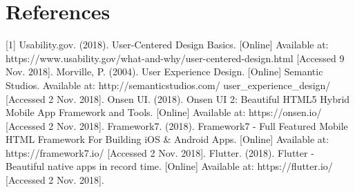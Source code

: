 \documentclass[a4paper, 11pt]{article} %
\begin{document}

\section{References}
    [1] Usability.gov. (2018). User-Centered Design Basics. [Online] Available at: https://www.usability.gov/what-and-why/user-centered-design.html [Accessed 9 Nov. 2018]. \newline
    [2] Morville, P. (2004). User Experience Design. [Online] Semantic Studios. Available at: http://semanticstudios.com/ \newline user\_experience\_design/ [Accessed 2 Nov. 2018]. \newline
    [3] Onsen UI. (2018). Onsen UI 2: Beautiful HTML5 Hybrid Mobile App Framework and Tools. [Online] Available at: https://onsen.io/ [Accessed 2 Nov. 2018]. \newline
    [4] Framework7. (2018). Framework7 - Full Featured Mobile HTML Framework For Building iOS \& Android Apps. [Online] Available at: https://framework7.io/ [Accessed 2 Nov. 2018]. \newline
    [5] Flutter. (2018). Flutter - Beautiful native apps in record time. [Online] Available at: https://flutter.io/ [Accessed 2 Nov. 2018].


\end{document}
